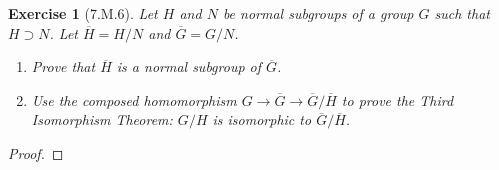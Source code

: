 \documentclass[12pt]{article}
\newtheorem*{exer}{Exercise}
\begin{document}

\begin{exer}[7.M.6]

    Let $H$ and $N$ be normal subgroups of a group $G$ such that $H
    \supset N$. Let $\overline{H} = H/N$ and $\overline{G} = G/N$.

    \begin{enumerate}
        \item Prove that $\overline{H}$ is a normal subgroup of
            $\overline{G}$. 
        \item Use the composed homomorphism $G \rightarrow \overline{G}
            \rightarrow \overline{G}/\overline{H}$ to prove the
            \textit{Third Isomorphism Theorem}: $G/H$ is isomorphic to
            $\overline{G} / \overline{H}$.
            
    \end{enumerate}

\end{exer}

\begin{proof}

\end{proof}
\end{document}

